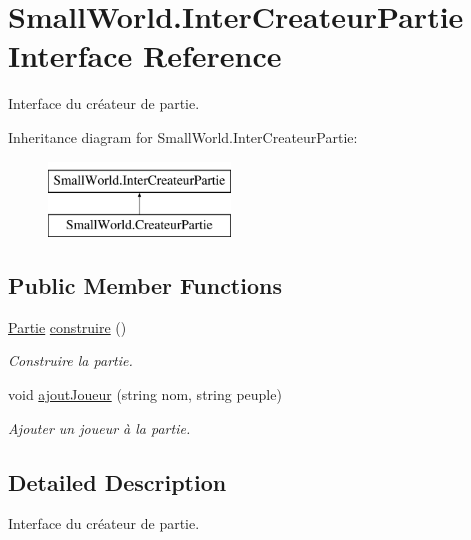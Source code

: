 \hypertarget{interface_small_world_1_1_inter_createur_partie}{\section{Small\-World.\-Inter\-Createur\-Partie Interface Reference}
\label{interface_small_world_1_1_inter_createur_partie}
}


Interface du créateur de partie.  


Inheritance diagram for Small\-World.\-Inter\-Createur\-Partie\-:\begin{figure}[H]
\begin{center}
\leavevmode
\includegraphics[height=2.000000cm]{interface_small_world_1_1_inter_createur_partie}
\end{center}
\end{figure}
\subsection*{Public Member Functions}
\begin{DoxyCompactItemize}
\item 
\hypertarget{interface_small_world_1_1_inter_createur_partie_a84bc048d2a71699fef54ef531477c917}{\hyperlink{class_small_world_1_1_partie}{Partie} \hyperlink{interface_small_world_1_1_inter_createur_partie_a84bc048d2a71699fef54ef531477c917}{construire} ()}\label{interface_small_world_1_1_inter_createur_partie_a84bc048d2a71699fef54ef531477c917}

\begin{DoxyCompactList}\small\item\em Construire la partie. \end{DoxyCompactList}\item 
void \hyperlink{interface_small_world_1_1_inter_createur_partie_af3fa5aaff01c6709b99eff93b6252da5}{ajout\-Joueur} (string nom, string peuple)
\begin{DoxyCompactList}\small\item\em Ajouter un joueur à la partie. \end{DoxyCompactList}\end{DoxyCompactItemize}


\subsection{Detailed Description}
Interface du créateur de partie. 

